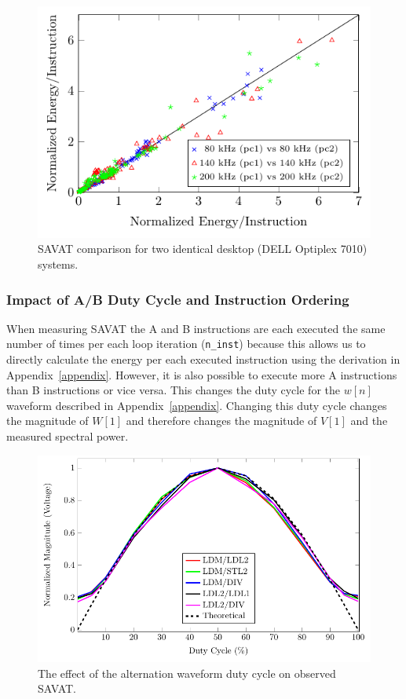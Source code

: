 \begin{figure}[htb]
  \centering%
  \includegraphics[width=5in]{../TEMC_SAVAT/figures/two_pcs.pdf}
  \caption{SAVAT comparison for two identical desktop (DELL Optiplex 7010) systems.}%
  \label{fig:2PCs}
\end{figure}

\subsubsection{Impact of A/B Duty Cycle and Instruction Ordering}\label{sec:dutycycle}

When measuring SAVAT the A and B instructions are each executed the same number of times per each loop iteration (\texttt{n\_inst}) because this allows us to directly calculate the energy per each executed instruction using the derivation in Appendix~\ref{appendix}. However, it is also possible to execute more A instructions than B instructions or vice versa. This changes the duty cycle for the $w[n]$ waveform described in Appendix~\ref{appendix}. Changing this duty cycle changes the magnitude of $W[1]$ and therefore changes the magnitude of $V[1]$ and the measured spectral power. 

\begin{figure}[htb]
\centering
\includegraphics[width=5in]{../TEMC_SAVAT/duty_fit.pdf}
\caption{The effect of the alternation waveform duty cycle on observed SAVAT.}
\label{duty_fit}
\end{figure}

